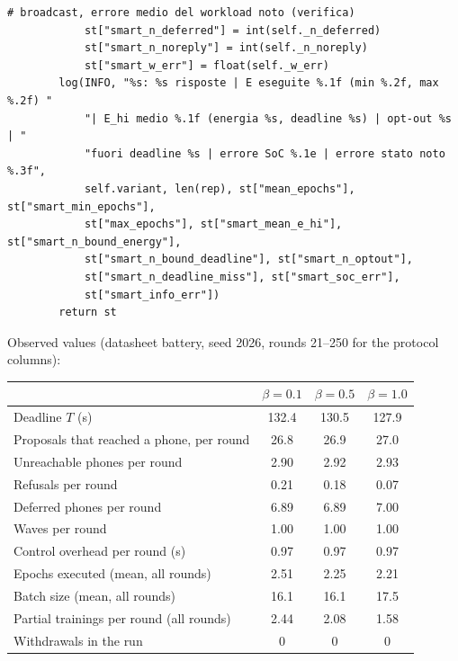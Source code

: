 \documentclass[11pt,a4paper]{article}
\begin{document}
\begin{lstlisting}[style=py,firstnumber=908,caption={\texttt{tesifl/strategies/sage\_smart.py}, lines 908--962}]
            # broadcast, errore medio del workload noto (verifica)
            st["smart_n_deferred"] = int(self._n_deferred)
            st["smart_n_noreply"] = int(self._n_noreply)
            st["smart_w_err"] = float(self._w_err)
        log(INFO, "%s: %s risposte | E eseguite %.1f (min %.2f, max %.2f) "
            "| E_hi medio %.1f (energia %s, deadline %s) | opt-out %s | "
            "fuori deadline %s | errore SoC %.1e | errore stato noto %.3f",
            self.variant, len(rep), st["mean_epochs"], st["smart_min_epochs"],
            st["max_epochs"], st["smart_mean_e_hi"], st["smart_n_bound_energy"],
            st["smart_n_bound_deadline"], st["smart_n_optout"],
            st["smart_n_deadline_miss"], st["smart_soc_err"],
            st["smart_info_err"])
        return st
\end{lstlisting}

Observed values (datasheet battery, seed 2026, rounds 21--250 for the protocol
columns):

\begin{table}[H]
  \centering
  \begin{tabular}{lccc}
    \toprule
    & $\beta = 0.1$ & $\beta = 0.5$ & $\beta = 1.0$ \\
    \midrule
    Deadline $T$ (s)                          & 132.4 & 130.5 & 127.9 \\
    Proposals that reached a phone, per round & 26.8  & 26.9  & 27.0 \\
    Unreachable phones per round              & 2.90  & 2.92  & 2.93 \\
    Refusals per round                        & 0.21  & 0.18  & 0.07 \\
    Deferred phones per round                 & 6.89  & 6.89  & 7.00 \\
    Waves per round                           & 1.00  & 1.00  & 1.00 \\
    Control overhead per round (s)            & 0.97  & 0.97  & 0.97 \\
    Epochs executed (mean, all rounds)        & 2.51  & 2.25  & 2.21 \\
    Batch size (mean, all rounds)             & 16.1  & 16.1  & 17.5 \\
    Partial trainings per round (all rounds)  & 2.44  & 2.08  & 1.58 \\
    Withdrawals in the run                    & 0     & 0     & 0 \\
    \bottomrule
  \end{tabular}
\end{table}
\end{document}
